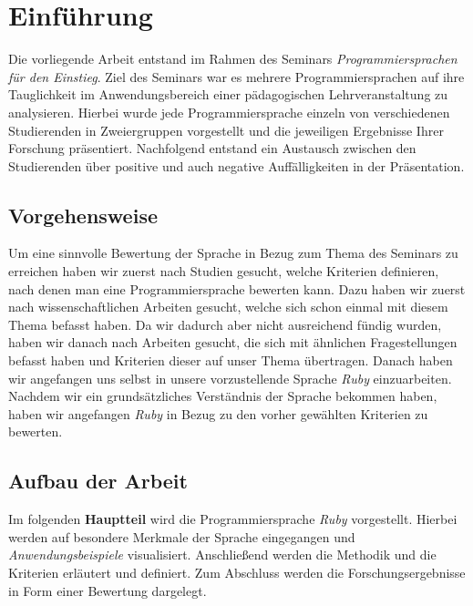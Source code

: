 \documentclass[12pt,DIV=14, version=first, BCOR=10mm,a4paper,twoside,parskip=half-,headsepline,headinclude]{scrartcl}
\begin{document}
\section{Einführung}
\begin{flushleft}
Die vorliegende Arbeit entstand im Rahmen des Seminars \textit{\glqq Programmiersprachen für den Einstieg\grqq}. Ziel des Seminars war es mehrere Programmiersprachen auf ihre Tauglichkeit im Anwendungsbereich einer pädagogischen Lehrveranstaltung zu analysieren. Hierbei wurde jede Programmiersprache einzeln von verschiedenen Studierenden in Zweiergruppen vorgestellt und die jeweiligen Ergebnisse Ihrer Forschung präsentiert. Nachfolgend entstand ein Austausch zwischen den Studierenden über positive und auch negative Auffälligkeiten in der Präsentation.
\end{flushleft}

\subsection{Vorgehensweise}
\begin{flushleft}
Um eine sinnvolle Bewertung der Sprache in Bezug zum Thema des Seminars zu erreichen haben wir zuerst nach Studien gesucht, welche Kriterien definieren, nach denen man eine Programmiersprache bewerten kann. Dazu haben wir zuerst nach wissenschaftlichen Arbeiten gesucht, welche sich schon einmal mit diesem Thema befasst haben. Da wir dadurch aber nicht ausreichend fündig wurden, haben wir danach nach Arbeiten gesucht, die sich mit ähnlichen Fragestellungen befasst haben und Kriterien dieser auf unser Thema übertragen. Danach haben wir angefangen uns selbst in unsere vorzustellende Sprache \textit{\glqq Ruby\grqq} einzuarbeiten. Nachdem wir ein grundsätzliches Verständnis der Sprache bekommen haben, haben wir angefangen \textit{\glqq Ruby\grqq} in Bezug zu den vorher gewählten Kriterien zu bewerten.
\end{flushleft}

\subsection{Aufbau der Arbeit}
\begin{flushleft}
Im folgenden \textbf{Hauptteil} wird die Programmiersprache \textit{\glqq Ruby\grqq} vorgestellt. Hierbei werden auf besondere Merkmale der Sprache eingegangen und \textit{Anwendungsbeispiele} visualisiert. Anschließend werden die Methodik und die Kriterien erläutert und definiert. Zum Abschluss werden die Forschungsergebnisse in Form einer Bewertung dargelegt.
\end{flushleft}
\end{document}
